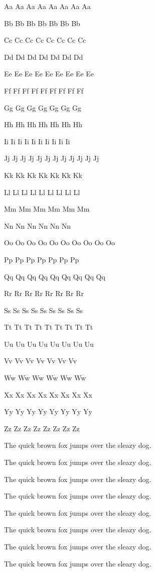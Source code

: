 \documentclass{worksheet}
\begin{document}
\begin{drillsheet}

\small
\calligra

Aa Aa Aa Aa Aa Aa Aa Aa

Bb Bb Bb Bb Bb Bb Bb

Cc Cc Cc Cc Cc Cc Cc Cc

Dd Dd Dd Dd Dd Dd Dd

Ee Ee Ee Ee Ee Ee Ee Ee Ee

Ff Ff Ff Ff Ff Ff Ff Ff Ff

Gg Gg Gg Gg Gg Gg Gg

Hh Hh Hh Hh Hh Hh Hh

Ii Ii Ii Ii Ii Ii Ii Ii Ii Ii

Jj Jj Jj Jj Jj Jj Jj Jj Jj Jj Jj Jj

Kk Kk Kk Kk Kk Kk Kk

Ll Ll Ll Ll Ll Ll Ll Ll Ll

Mm Mm Mm Mm Mm Mm

Nn Nn Nn Nn Nn Nn

Oo Oo Oo Oo Oo Oo Oo Oo Oo Oo

Pp Pp Pp Pp Pp Pp Pp

Qq Qq Qq Qq Qq Qq Qq Qq Qq

Rr Rr Rr Rr Rr Rr Rr Rr

Ss Ss Ss Ss Ss Ss Ss Ss Ss

Tt Tt Tt Tt Tt Tt Tt Tt Tt

Uu Uu Uu Uu Uu Uu Uu Uu

Vv Vv Vv Vv Vv Vv Vv

Ww Ww Ww Ww Ww Ww

Xx Xx Xx Xx Xx Xx Xx Xx

Yy Yy Yy Yy Yy Yy Yy Yy

Zz Zz Zz Zz Zz Zz Zz Zz

The quick brown fox jumps over the sleazy dog.

The quick brown fox jumps over the sleazy dog.

The quick brown fox jumps over the sleazy dog.

The quick brown fox jumps over the sleazy dog.

The quick brown fox jumps over the sleazy dog.

The quick brown fox jumps over the sleazy dog.

The quick brown fox jumps over the sleazy dog.

The quick brown fox jumps over the sleazy dog.

\end{drillsheet}
\end{document}
